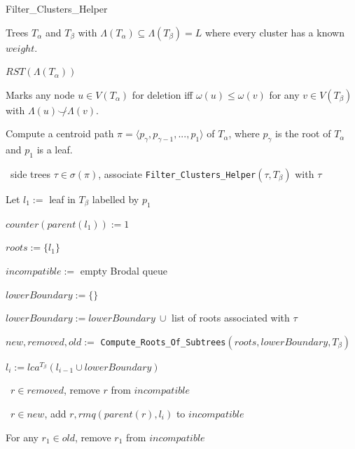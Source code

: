 \documentclass{article}
\newcommand{\compatible}{\smile}
\newcommand{\leafset}{\Lambda}
\newcommand{\weight}{\omega}
\begin{document}
    \begin{algorithm}[ht]
        \caption{Filter\_Clusters\_Helper}
        \label{alg:filterclustershelper}

        \begin{algorithmic}[1]
            \Input Trees $T_\alpha$ and $T_\beta$ with $\leafset(T_\alpha) \subseteq \leafset(T_\beta) = L$ where every cluster has a known $weight$.

            \Output $RST(\leafset(T_\alpha))$

            \SideEffect Marks any node $u \in V(T_\alpha)$ for deletion iff $\weight(u) \leq \weight(v)$ for any $v \in V(T_\beta)$ with $\leafset(u) \not\compatible \leafset(v)$.

            \State Compute a centroid path $\pi = \langle p_{\gamma}, p_{\gamma - 1}, ..., p_1 \rangle$ of $T_\alpha$, where $p_{\gamma}$ is the root of $T_\alpha$ and $p_1$ is a leaf.

            \State \algorithmicforall\ side trees $\tau \in \sigma(\pi)$,
                associate \texttt{Filter\_Clusters\_Helper}$(\tau, T_\beta)$ with $\tau$

            \State Let $l_1 :=$ leaf in $T_\beta$ labelled by $p_1$

            \State $counter(parent(l_1)) := 1$

            \State $roots := \{l_1\}$

            \State $incompatible :=$ empty Brodal queue

                \State $lowerBoundary := \{\}$

                    \State $lowerBoundary := lowerBoundary\ \cup$ list of roots associated with $\tau$
                \EndFor

                \State $new, removed, old :=$ \texttt{Compute\_Roots\_Of\_Subtrees}$(roots, lowerBoundary, T_\beta)$

                \State $l_i := lca^{T_\beta}(l_{i-1} \cup lowerBoundary)$

                \State \algorithmicforall\ $r \in removed$, remove $r$ from $incompatible$
                \label{step:removedrootsremoval}

                \State \algorithmicforall\ $r \in new$, add $r, rmq(parent(r), l_i)$ to $incompatible$

                    \State For any $r_1 \in old$, remove $r_1$ from $incompatible$
                    \label{step:oldrootremoval}


\end{algorithmic}
\end{algorithm}
\end{document}
